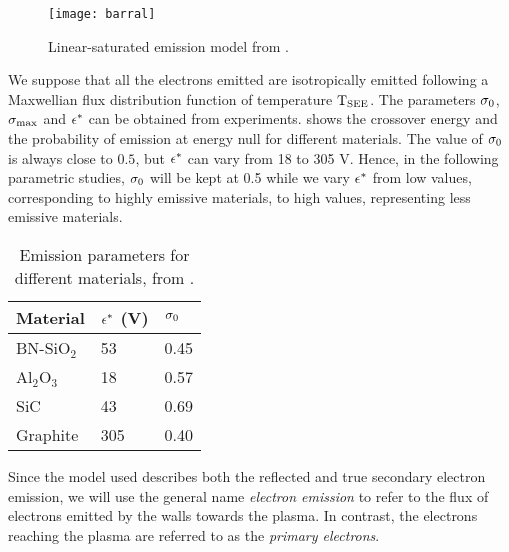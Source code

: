 \begin{figure}[hbt]
  \centering
  \texttt{[image: barral]}
  \caption{Linear-saturated emission model from \citet{barral2003a}.}
  \label{fig-modelbarral}
\end{figure}

 We suppose that all the electrons emitted are isotropically emitted following a Maxwellian flux distribution function of temperature $\mathrm{T_{SEE}}$.
 The parameters $\sigma _0$,  $\sigma _{\rm max} $ and $\epsilon^{*}$ can be obtained from experiments. 
  shows the crossover energy and the  probability of emission at energy null for different materials.
 The value of $\sigma _0$ is always close to $0.5$, but $\epsilon^{*}$ can vary from 18 to 305 V.
 Hence, in the following parametric studies, $\sigma _0$ will be kept at 0.5 while we vary $\epsilon^{*}$ from low values, corresponding to highly emissive materials, to high values, representing less emissive materials.
 
 \begin{table}[hbt]
   \centering
   \caption{Emission parameters for different materials, from \citet{barral2003a}.}
   \label{tab-seeparames}
   \begin{tabular}{@{}lll@{}} \toprule
   Material & $\epsilon^{*}$ (V)& $\sigma _0$ \\ \midrule
   BN-SiO$_2$ & 53 & 0.45 \\ 
   Al$_2$O$_3$ & 18  & 0.57 \\ 
   SiC     &  43  &0.69  \\
   Graphite & 305  & 0.40 \\ 
   \bottomrule
   \end{tabular}
 \end{table}
 
 Since the model used describes both the reflected and true secondary electron emission, we will use the general name \emph{electron emission}  to refer to the flux of electrons emitted by the walls towards the plasma.
 In contrast, the electrons reaching the plasma are referred to as the \emph{primary electrons}.
